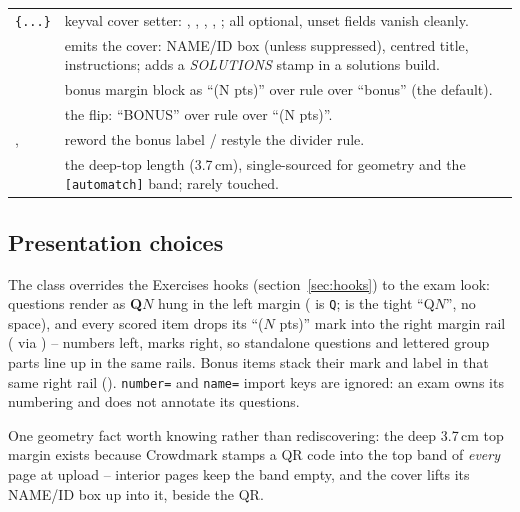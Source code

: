 \begin{center}
\begin{tabularx}{\linewidth}{@{}l Y@{}}
\texttt{\{...\}} & keyval cover setter: ,
  , , , ; all optional,
  unset fields vanish cleanly.\\
 & emits the cover: NAME/ID box (unless suppressed),
  centred title, instructions; adds a \emph{SOLUTIONS} stamp in a solutions
  build.\\
 & bonus margin block as ``(N pts)'' over rule over
  ``bonus'' (the default).\\
 & the flip: ``BONUS'' over rule over ``(N pts)''.\\
,  & reword the bonus label /
  restyle the divider rule.\\
 & the deep-top length (3.7\,cm), single-sourced for
  geometry and the \texttt{[automatch]} band; rarely touched.\\
\end{tabularx}
\end{center}

\subsection*{Presentation choices}

The class overrides the Exercises hooks (section~\ref{sec:hooks}) to the
exam look: questions render as \textbf{Q$N$} hung in the left margin
( is \texttt{Q};  is the tight
``Q$N$'', no space), and every scored item drops its ``($N$ pts)'' mark
into the right margin rail ( via ) --
numbers left, marks right, so standalone questions and lettered group parts
line up in the same rails. Bonus items stack their mark and label in that
same right rail (). \texttt{number=} and
\texttt{name=} import keys are ignored: an exam owns its numbering and does
not annotate its questions.

One geometry fact worth knowing rather than rediscovering: the deep
3.7\,cm top margin exists because Crowdmark stamps a QR code into the top
band of \emph{every} page at upload -- interior pages keep the band empty,
and the cover lifts its NAME/ID box up into it, beside the QR.
